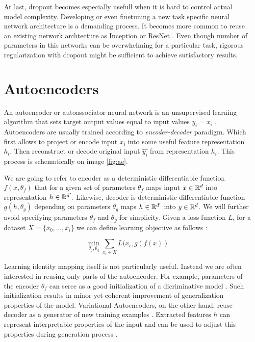 At last, dropout becomes especially usefull when it is hard to control actual model complexity. Developing or even finetuning a new task specific neural network architecture is a demanding process. It becomes more common to reuse an existing network  archtecture as Inception or ResNet \cite{He2015, Szegedy2016}. Even though number of parameters in this networks can be overwhelming for a particular task, rigorous regularization with dropout might be sufficient to achieve sutisfactory results.


\section{Autoencoders}\label{ch:ae}
An autoencoder or autoassociator neural network is an unsupervised learning algorithm that sets target output values equal to input values $y_i=x_i$ \cite{Ng2011,RanzatoMarcAurelio2007}.
Autoencoders are usually trained according to \textit{encoder-decoder} paradigm.
Which first allows to project or encode input $x_i$ into some useful feature representation $h_i$.
Then reconstruct or decode original input $\hat{y_i}$ from representation $h_i$.
This process is schematically on image \ref{fig:ae}.





We are going to refer to encoder as a deterministic differentiable function $f(x, \theta_f)$ that for a given set of parameters $\theta_f$ maps input $x\in \Bbb{R}^d$ into representation $h \in \Bbb{R}^{d'}$.
Likewise, decoder is deterministic differentiable function $g(h, \theta_g)$ depending on parameters $\theta_g$ maps $h\in\Bbb{R}^{d'}$ into $y\in \Bbb{R}^d$. We will further avoid specifying parameters $\theta_f$ and $\theta_g$ for simplicity.
Given a loss function $L$, for a dataset $X=\{x_0, ..., x_i\}$ we can define learning objective as follows \cite{Good2016}:

\begin{equation}\label{eq:ae}
\min_{\theta_f, \theta_g}\sum\limits_{x_i \in X}{L(x_i, g(f(x))}
\end{equation}

Learning identity mapping itself is not particularly useful.
Instead we are often interested in reusing only parts of the autoencoder.
For example, parameters of the encoder $\theta_f$ can serce as a good initialization of a dicriminative model \cite{Masci2011, Vincent2010, Zhao2015}.
Such initialization results in minor yet coherent improvement of generalization properties of the model.
Variational Autoencoders, on the other hand, reuse decoder as a generator of new training examples \cite{Kingma2013}.
Extracted features $h$ can represent interpretable properties of the input and can be used to adjust this
properties during generation process \cite{Kulkarni2015, Whitney2016}.

